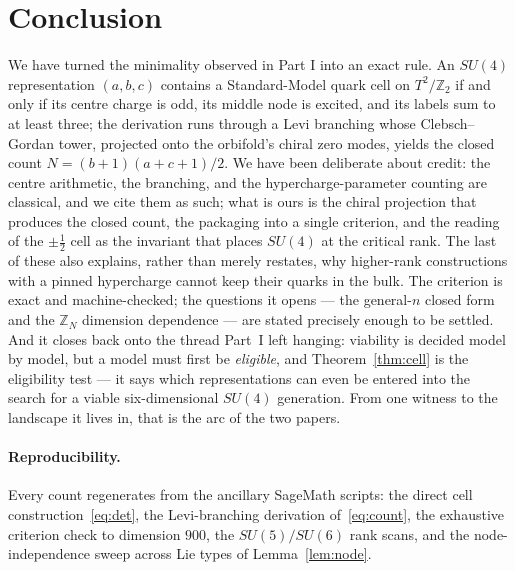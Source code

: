 \documentclass[11pt,a4paper]{article}
\newcommand{\ZZ}{\mathbb{Z}}
\begin{document}
\section{Conclusion}\label{sec:conclusion}
We have turned the minimality observed in Part I into an exact rule. An $SU(4)$
representation $(a,b,c)$ contains a Standard-Model quark cell on $T^2/\mathbb{Z}_2$ if and
only if its centre charge is odd, its middle node is excited, and its labels sum to at least
three; the derivation runs through a Levi branching whose Clebsch--Gordan tower, projected
onto the orbifold's chiral zero modes, yields the closed count $N=(b+1)(a+c+1)/2$. We have
been deliberate about credit: the centre arithmetic, the branching, and the
hypercharge-parameter counting are classical, and we cite them as such; what is ours is the
chiral projection that produces the closed count, the packaging into a single criterion, and
the reading of the $\pm\tfrac12$ cell as the invariant that places $SU(4)$ at the critical
rank. The last of these also explains, rather than merely restates, why higher-rank
constructions with a pinned hypercharge cannot keep their quarks in the bulk. The criterion
is exact and machine-checked; the questions it opens --- the general-$n$ closed form and
the $\ZZ_N$ dimension dependence --- are stated precisely enough to be settled. And it
closes back onto the thread Part~I left hanging: viability is decided model by model, but a
model must first be \emph{eligible}, and Theorem~\ref{thm:cell} is the eligibility test ---
it says which representations can even be entered into the search for a viable
six-dimensional $SU(4)$ generation. From one witness to the landscape it lives in, that is
the arc of the two papers.

\paragraph{Reproducibility.} Every count regenerates from the ancillary SageMath scripts:
the direct cell construction~\eqref{eq:det}, the Levi-branching derivation of~\eqref{eq:count},
the exhaustive criterion check to dimension $900$, the $SU(5)/SU(6)$ rank scans, and the
node-independence sweep across Lie types of Lemma~\ref{lem:node}.
\end{document}
